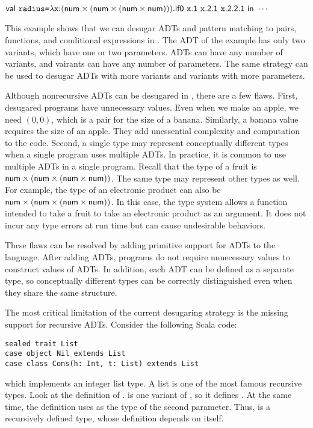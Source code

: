 $\textsf{val}\ \texttt{radius}\texttt{=}\lambda\texttt{x}{:}(\textsf{num}\times(\textsf{num}\times(\textsf{num}\times\textsf{num}))).\textsf{if0}\ \texttt{x}\textsf{.1}\ \texttt{x}\textsf{.2.1}\ \texttt{x}\textsf{.2.2.1}\ \textsf{in}\ \cdots$

This example shows that we can desugar ADTs and pattern matching to pairs,
functions, and conditional expressions in \plang. The ADT of the example has
only two variants, which have one or two parameters. ADTs can have any number of
variants, and vairants can have any number of parameters. The same strategy can be
used to desugar ADTs with more variants and variants with more parameters.

Although nonrecursive ADTs can be desugared in \plang, there are a few flaws.
First, desugared programs have unnecessary values. Even when we make an apple, we
need $(0,0)$, which is a pair for the size of a banana. Similarly, a banana
value requires the size of an apple. They add unessential complexity and
computation to the code. Second, a single type may represent conceptually
different types when a single program uses multiple ADTs. In practice, it is
common to use multiple ADTs in a single program. Recall that the type of a fruit
is $\textsf{num}\times(\textsf{num}\times(\textsf{num}\times\textsf{num}))$. The same type may represent
other types as well. For example, the type of an electronic product can also be
$\textsf{num}\times(\textsf{num}\times(\textsf{num}\times\textsf{num}))$. In this case, the type system
allows a function intended to take a fruit to take an electronic product
as an argument. It does not incur any type errors at run time but can cause
undesirable behaviors.

These flaws can be resolved by adding primitive support for ADTs to the language.
After adding ADTs,
programs do not require unnecessary values to construct values of ADTs.
In addition, each ADT can be defined as a separate type, so
conceptually different types can be correctly distinguished even when they share
the same structure.

The most critical limitation of the current desugaring strategy is the missing
support for recursive ADTs. Consider the following Scala code:

\begin{verbatim}
sealed trait List
case object Nil extends List
case class Cons(h: Int, t: List) extends List
\end{verbatim}

which implements an integer list type. A list is one of the most famous
recursive types. Look at the definition of .  is one
variant of , so it defines . At the same time, the
definition uses  as the type of the second parameter. Thus, 
is a recursively defined type, whose definition depends on itself.

